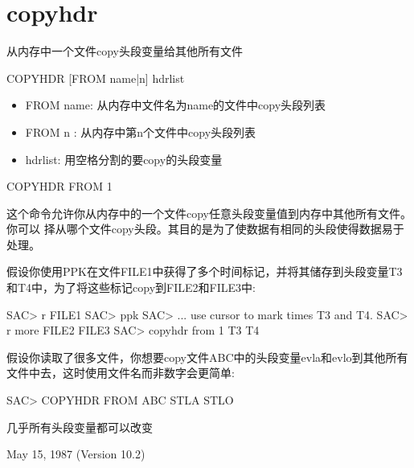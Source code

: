 \section{copyhdr}
\label{cmd:copyhdr}

从内存中一个文件copy头段变量给其他所有文件

COPYHDR [FROM name|n] hdrlist

\begin{itemize}
\item FROM name: 从内存中文件名为name的文件中copy头段列表 
\item FROM n : 从内存中第n个文件中copy头段列表 
\item hdrlist: 用空格分割的要copy的头段变量 
\end{itemize}

COPYHDR FROM 1

这个命令允许你从内存中的一个文件copy任意头段变量值到内存中其他所有文件。你可以
择从哪个文件copy头段。其目的是为了使数据有相同的头段使得数据易于处理。

假设你使用PPK在文件FILE1中获得了多个时间标记，并将其储存到头段变量T3和T4中，为了将这些标记copy到FILE2和FILE3中:
\begin{SACCode}
SAC> r FILE1
SAC> ppk
SAC> ... use cursor to mark times T3 and T4.
SAC> r more FILE2 FILE3
SAC> copyhdr from 1 T3 T4
\end{SACCode}
假设你读取了很多文件，你想要copy文件ABC中的头段变量evla和evlo到其他所有文件中去，这时使用文件名而非数字会更简单:
\begin{SACCode}
SAC> COPYHDR FROM ABC STLA STLO
\end{SACCode}

几乎所有头段变量都可以改变

May 15, 1987 (Version 10.2)
